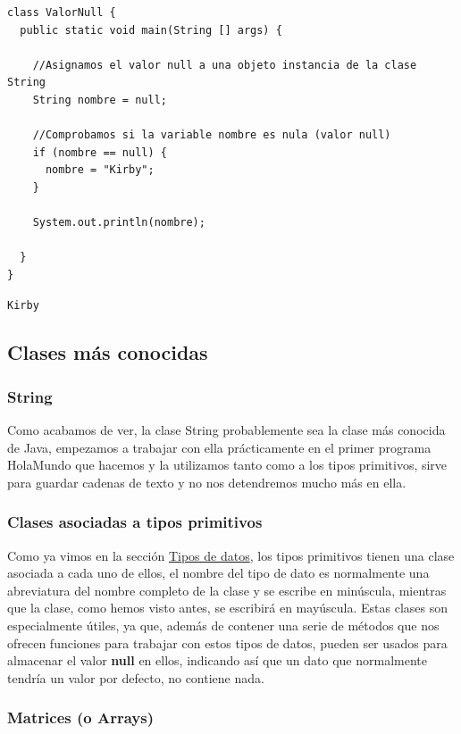 \documentclass[11pt]{article}
\begin{document}
\begin{verbatim}
class ValorNull {
  public static void main(String [] args) {

    //Asignamos el valor null a una objeto instancia de la clase String
    String nombre = null;

    //Comprobamos si la variable nombre es nula (valor null)
    if (nombre == null) {
      nombre = "Kirby";
    }

    System.out.println(nombre);

  }
}
\end{verbatim}

\begin{verbatim}
Kirby
\end{verbatim}

\subsection{Clases más conocidas}
\label{sec:org254c006}

\subsubsection{String}
\label{sec:org25fdeb8}
Como acabamos de ver, la clase String probablemente sea la clase más conocida de Java, empezamos a trabajar con ella prácticamente en el primer programa HolaMundo que hacemos y la utilizamos tanto como a los tipos primitivos, sirve para guardar cadenas de texto y no nos detendremos mucho más en ella.

\subsubsection{Clases asociadas a tipos primitivos}
\label{sec:org3f7dda2}
Como ya vimos en la sección \hyperref[org248014b]{Tipos de datos}, los tipos primitivos tienen una clase asociada a cada uno de ellos, el nombre del tipo de dato es normalmente una abreviatura del nombre completo de la clase y se escribe en minúscula, mientras que la clase, como hemos visto antes, se escribirá en mayúscula. Estas clases son especialmente útiles, ya que, además de contener una serie de métodos que nos ofrecen funciones para trabajar con estos tipos de datos, pueden ser usados para almacenar el valor \textbf{null} en ellos, indicando así que un dato que normalmente tendría un valor por defecto, no contiene nada.

\subsubsection{Matrices (o Arrays)}
\label{sec:org54080e5}
\end{document}

